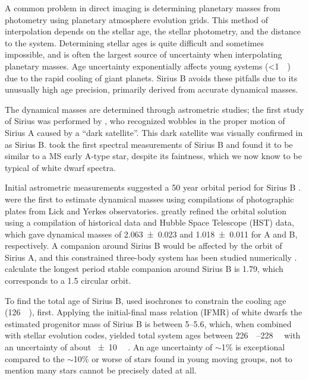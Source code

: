 \documentclass[twocolumn,linenumbers]{aastex631}
\begin{document}
A common problem in direct imaging is determining planetary masses from photometry using planetary atmosphere evolution grids. This method of interpolation depends on the stellar age, the stellar photometry, and the distance to the system. Determining stellar ages is quite difficult and sometimes impossible, and is often the largest source of uncertainty when interpolating planetary masses. Age uncertainty exponentially affects young systems (\textless\qty{1}{\giga\year}) due to the rapid cooling of giant planets. Sirius B avoids these pitfalls due to its unusually high age precision, primarily derived from accurate dynamical masses.

The dynamical masses are determined through astrometric studies; the first study of Sirius was performed by \citet{bessel_variations_1844}, who recognized wobbles in the proper motion of Sirius A caused by a ``dark satellite''. This dark satellite was visually confirmed in \citet{bond_companion_1862} as Sirius B. \citet{adams_spectrum_1915} took the first spectral measurements of Sirius B and found it to be similar to a MS early A-type star, despite its faintness, which we now know to be typical of white dwarf spectra.

Initial astrometric measurements suggested a 50 year orbital period for Sirius B \citep{auwers_orbit_1864}. \citet{van_den_bos_orbit_1960,gatewood_study_1978} were the first to estimate dynamical masses using compilations of photographic plates from Lick and Yerkes observatories. \citet{bond_sirius_2017} greatly refined the orbital solution using a compilation of historical data and Hubble Space Telescope (HST) data, which gave dynamical masses of \qty{2.063+-0.023}{\solarmass} and \qty{1.018+-0.011}{\solarmass} for A and B, respectively. A companion around Sirius B would be affected by the orbit of Sirius A, and this constrained three-body system has been studied numerically \citep{holman_long-term_1999}. \citet{bond_sirius_2017} calculate the longest period stable companion around Sirius B is \qty{1.79}{\year}, which corresponds to a \qty{1.5}{\au} circular orbit.

To find the total age of Sirius B, \citet{bond_sirius_2017} used isochrones to constrain the cooling age (\qty{126}{\mega\year}), first. Applying the initial-final mass relation (IFMR) of white dwarfs \citep{cummings_two_2016} the estimated progenitor mass of Sirius B is between \qtyrange{5}{5.6}{\solarmass}, which, when combined with stellar evolution codes, yielded total system ages between \qtyrange{226}{228}{\mega\year} with an uncertainty of about \qty{+-10}{\mega\year} \citep{bond_sirius_2017}. An age uncertainty of $\sim$1\% is exceptional compared to the $\sim$10\% or worse of stars found in young moving groups, not to mention many stars cannot be precisely dated at all.
\end{document}

